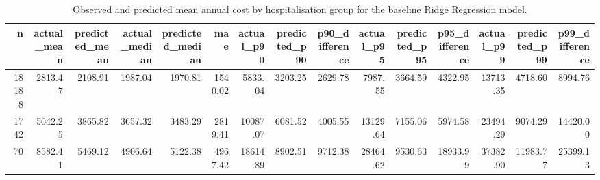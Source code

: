 \begin{table}
\caption{Observed and predicted mean annual cost by hospitalisation group for the baseline Ridge Regression model.}
\label{tab:03-ridge-group-summary-hospitalisation}
\begin{tabular}{rrrrrrrrrrrrrrr}
\toprule
n & actual_mean & predicted_mean & actual_median & predicted_median & mae & actual_p90 & predicted_p90 & p90_difference & actual_p95 & predicted_p95 & p95_difference & actual_p99 & predicted_p99 & p99_difference \\
\midrule
18188 & 2813.47 & 2108.91 & 1987.04 & 1970.81 & 1540.02 & 5833.04 & 3203.25 & 2629.78 & 7987.55 & 3664.59 & 4322.95 & 13713.35 & 4718.60 & 8994.76 \\
1742 & 5042.25 & 3865.82 & 3657.32 & 3483.29 & 2819.41 & 10087.07 & 6081.52 & 4005.55 & 13129.64 & 7155.06 & 5974.58 & 23494.29 & 9074.29 & 14420.00 \\
70 & 8582.41 & 5469.12 & 4906.64 & 5122.38 & 4967.42 & 18614.89 & 8902.51 & 9712.38 & 28464.62 & 9530.63 & 18933.99 & 37382.90 & 11983.77 & 25399.13 \\
\bottomrule
\end{tabular}
\end{table}
